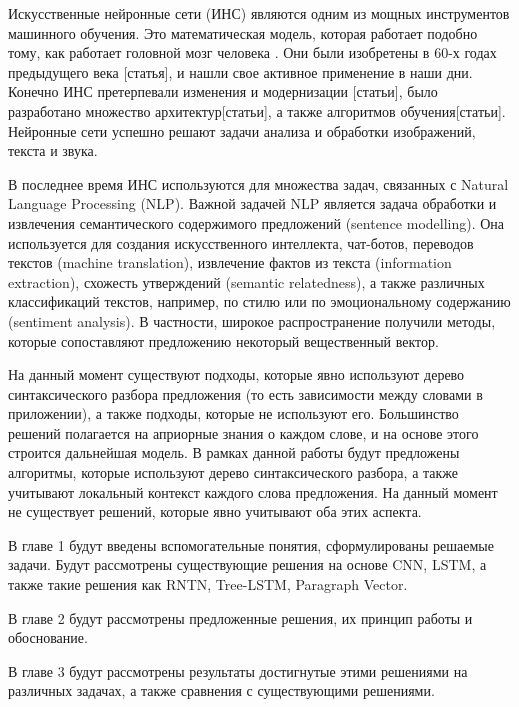 \startprefacepage

Искусственные нейронные сети (ИНС) являются одним из мощных инструментов машинного
обучения.
Это математическая модель, которая работает подобно тому, как работает головной
мозг человека \cite{rosenblatt58a}.
Они были изобретены в 60-х годах предыдущего века [статья], и нашли свое активное
применение в наши дни. Конечно ИНС претерпевали изменения и модернизации
[статьи], было разработано множество архитектур[статьи], а также алгоритмов обучения[статьи].
Нейронные сети успешно решают задачи анализа и обработки изображений, текста и
звука.

В последнее время ИНС используются для множества задач, связанных с Natural
Language Processing (NLP). Важной задачей NLP является задача 
обработки и извлечения семантического содержимого предложений (sentence modelling).
Она используется для создания искусственного интеллекта, чат-ботов,
переводов текстов (machine translation), извлечение фактов из текста (information
extraction), схожесть утверждений (semantic relatedness), 
а также различных классификаций текстов, например,
по стилю или по эмоциональному содержанию (sentiment analysis).
В частности, широкое распространение получили методы, которые сопоставляют предложению некоторый вещественный вектор.

На данный момент существуют подходы, которые явно используют дерево синтаксического разбора предложения (то есть зависимости между словами в приложении), а также подходы, которые не используют его. Большинство решений полагается на априорные знания о каждом слове, и на основе этого строится дальнейшая модель.
В рамках данной работы будут предложены алгоритмы, которые используют дерево синтаксического разбора, а также учитывают локальный контекст каждого слова предложения. На данный момент не существует решений, которые явно учитывают оба этих аспекта.

В главе 1 будут введены вспомогательные понятия, сформулированы решаемые задачи.
Будут рассмотрены существующие решения на основе CNN, 
LSTM, а также такие решения как RNTN, Tree-LSTM, Paragraph Vector.

В главе 2 будут рассмотрены предложенные решения, их принцип работы и обоснование.

В главе 3 будут рассмотрены результаты достигнутые этими решениями на различных задачах, а также сравнения с существующими решениями.